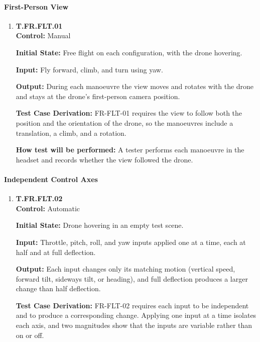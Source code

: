 \documentclass[12pt, titlepage]{article}
\begin{document}
{\sloppy
\paragraph{First-Person View}

\begin{enumerate}

\item{\hypertarget{test-fr-fl01}{}\textbf{T.FR.FLT.01}\\}
\textbf{Control:} Manual

\textbf{Initial State:} Free flight on each configuration, with the drone hovering.

\textbf{Input:} Fly forward, climb, and turn using yaw.

\textbf{Output:} During each manoeuvre the view moves and rotates with the drone and
stays at the drone's first-person camera position.

\textbf{Test Case Derivation:} \mbox{FR-FLT-01} requires the view to follow both the
position and the orientation of the drone, so the manoeuvres include a translation, a
climb, and a rotation.

\textbf{How test will be performed:} A tester performs each manoeuvre in the headset and
records whether the view followed the drone.

\end{enumerate}

\paragraph{Independent Control Axes}

\begin{enumerate}

\item{\hypertarget{test-fr-fl02}{}\textbf{T.FR.FLT.02}\\}
\textbf{Control:} Automatic

\textbf{Initial State:} Drone hovering in an empty test scene.

\textbf{Input:} Throttle, pitch, roll, and yaw inputs applied one at a time, each at
half and at full deflection.

\textbf{Output:} Each input changes only its matching motion (vertical speed, forward
tilt, sideways tilt, or heading), and full deflection produces a larger change than half
deflection.

\textbf{Test Case Derivation:} \mbox{FR-FLT-02} requires each input to be independent
and to produce a corresponding change. Applying one input at a time isolates each axis,
and two magnitudes show that the inputs are variable rather than on or off.


\end{enumerate}}
\end{document}
